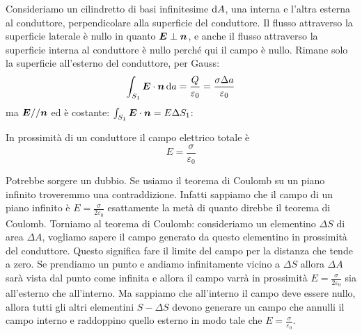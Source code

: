 Consideriamo un cilindretto di basi infinitesime $\mathrm{d} A$, una interna e l'altra esterna al conduttore, perpendicolare alla superficie del conduttore. Il flusso attraverso la superficie laterale è nullo in quanto $\boldsymbol{E}\perp\boldsymbol{n}$, e anche il flusso attraverso la superficie interna al conduttore è nullo perché qui il campo è nullo. Rimane solo la superficie all'esterno del conduttore, per Gauss:
\begin{equation*}\int_{S_1}\boldsymbol{E}\cdot\boldsymbol{n}\,\mathrm{d} a=\frac{Q}{\varepsilon_0}=\frac{\sigma\Delta a}{\varepsilon_0}\end{equation*}
ma $\boldsymbol{E}//\boldsymbol{n}$ ed è costante: $\int_{S_1}\boldsymbol{E}\cdot\boldsymbol{n}=E\Delta S_1$:
\begin{Teo}[Coulomb]
In prossimità di un conduttore il campo elettrico totale è \begin{equation}
E=\frac{\sigma}{\varepsilon_0}
\end{equation}
\end{Teo}

Potrebbe sorgere un dubbio. Se usiamo il teorema di Coulomb su un piano infinito troveremmo una contraddizione. Infatti sappiamo che il campo di un piano infinito è $E=\frac{\sigma}{2\varepsilon_0}$ esattamente la metà di quanto direbbe il teorema di Coulomb. Torniamo al teorema di Coulomb: consideriamo un elementino $\Delta S$ di area $\Delta A$, vogliamo sapere il campo generato da questo elementino in prossimità del conduttore. Questo significa fare il limite del campo per la distanza che tende a zero. Se prendiamo un punto e andiamo infinitamente vicino a $\Delta S$ allora $\Delta A$ sarà vista dal punto come infinita e allora il campo varrà in prossimità $E=\frac{\sigma}{2\varepsilon_0}$ sia all'esterno che all'interno. Ma sappiamo che all'interno il campo deve essere nullo, allora tutti gli altri elementini $S-\Delta S$ devono generare un campo che annulli il campo interno e raddoppino quello esterno in modo tale che $E=\frac{\sigma}{\varepsilon_0}$.

